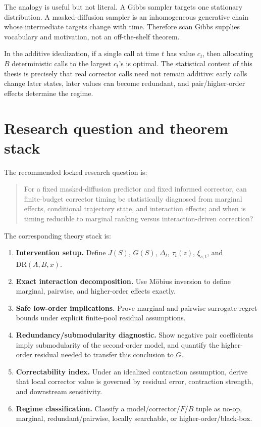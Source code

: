\documentclass[11pt]{article}
\newcommand{\1}{\mathbf 1}
\begin{document}
The analogy is useful but not literal.  A Gibbs sampler targets one stationary
distribution.  A masked-diffusion sampler is an inhomogeneous generative chain
whose intermediate targets change with time.  Therefore scan Gibbs supplies
vocabulary and motivation, not an off-the-shelf theorem.

In the additive idealization, if a single call at time \(t\) has value
\(c_t\), then allocating \(B\) deterministic calls to the largest \(c_t\)'s is
optimal.  The statistical content of this thesis is precisely that real
corrector calls need not remain additive: early calls change later states,
later values can become redundant, and pair/higher-order effects determine the
regime.

\section{Research question and theorem stack}

The recommended locked research question is:

\begin{quote}
For a fixed masked-diffusion predictor and fixed informed corrector, can
finite-budget corrector timing be statistically diagnosed from marginal
effects, conditional trajectory state, and interaction effects; and when is
timing reducible to marginal ranking versus interaction-driven correction?
\end{quote}

The corresponding theory stack is:

\begin{enumerate}[leftmargin=1.8em]
\item \textbf{Intervention setup.} Define \(J(S)\), \(G(S)\), \(\Delta_t\),
\(\tau_t(z)\), \(\xi_{s,t}\), and \(\mathrm{DR}(A,B,x)\).
\item \textbf{Exact interaction decomposition.} Use Möbius inversion to define
marginal, pairwise, and higher-order effects exactly.
\item \textbf{Safe low-order implications.} Prove marginal and pairwise
surrogate regret bounds under explicit finite-pool residual assumptions.
\item \textbf{Redundancy/submodularity diagnostic.} Show negative pair
coefficients imply submodularity of the second-order model, and quantify the
higher-order residual needed to transfer this conclusion to \(G\).
\item \textbf{Correctability index.} Under an idealized contraction assumption,
derive that local corrector value is governed by residual error, contraction
strength, and downstream sensitivity.
\item \textbf{Regime classification.} Classify a model/corrector/\(F\)/\(B\)
tuple as no-op, marginal, redundant/pairwise, locally searchable, or
higher-order/black-box.
\end{enumerate}
\end{document}
